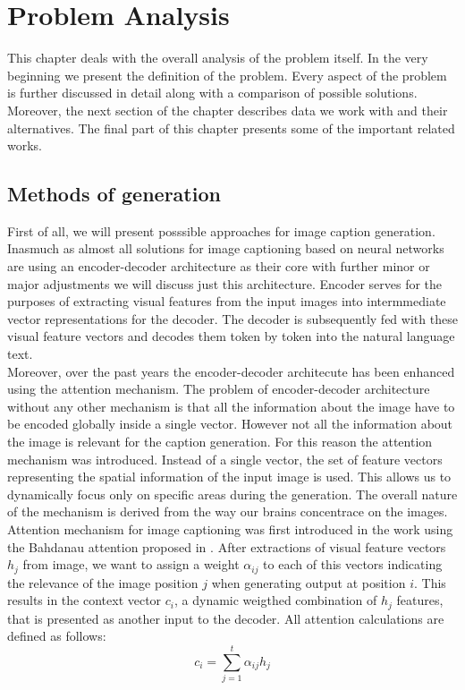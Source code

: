 \chapter{Problem Analysis}
This chapter deals with the overall analysis of the problem itself. In the very beginning we present the definition of the problem. Every aspect of the problem is further discussed in detail along with a comparison of possible solutions. Moreover, the next section of the chapter describes data we work with and their alternatives. The final part of this chapter presents some of the important related works.

\section{Methods of generation}
\label{sec:methodsOfGeneration}
First of all, we will present posssible approaches for image caption generation. Inasmuch as almost all solutions for image captioning based on neural networks are using an encoder-decoder architecture as their core with further minor or major adjustments we will discuss just this architecture. Encoder serves for the purposes of extracting visual features from the input images into intermmediate vector representations for the decoder. The decoder is subsequently fed with these visual feature vectors and decodes them token by token into the natural language text.\\

Moreover, over the past years the encoder-decoder architecute has been enhanced using the attention mechanism. The problem of encoder-decoder architecture without any other mechanism is that all the information about the image have to be encoded globally inside a single vector. However not all the information about the image is relevant for the caption generation. For this reason the attention mechanism was introduced. Instead of a single vector, the set of feature vectors representing the spatial information of the input image is used. This allows us to dynamically focus only on specific areas during the generation. The overall nature of the mechanism is derived from the way our brains concentrace on the images.\\

Attention mechanism for image captioning was first introduced in the \citet{xu2015show} work using the Bahdanau attention proposed in \citet{bahdanau2014neural}. After extractions of visual feature vectors $h_j$ from image, we want to assign a weight $\alpha_{ij}$ to each of this vectors indicating the relevance of the image position $j$ when generating output at position $i$. This results in the context vector $c_i$, a dynamic weigthed combination of $h_j$ features, that is presented as another input to the decoder. All attention calculations are defined as follows:
\begin{equation}\label{eq01:AttContext}
	c_i = \sum_{j=1}^{t} \alpha_{ij} h_j
\end{equation}

